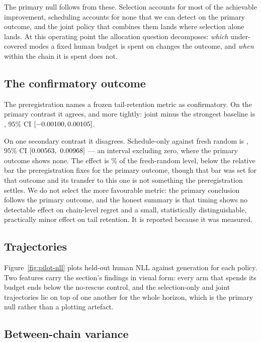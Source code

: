 The primary null follows from these. Selection accounts for most of the achievable
improvement, scheduling accounts for none that we can detect on the primary outcome, and
the joint policy that combines them lands where selection alone lands. At this operating
point the allocation question decomposes: \emph{which} under-covered modes a fixed human
budget is spent on changes the outcome, and \emph{when} within the chain it is spent does
not.

\subsection{The confirmatory outcome}

The preregistration names a frozen tail-retention metric as confirmatory. On the primary
contrast it agrees, and more tightly: joint minus the strongest baseline is
\PilotTailPrimaryMean{}, $95\%$ CI $[-0.00100, 0.00105]$.

On one secondary contrast it disagrees. Schedule-only against fresh random is
\PilotTailSchedRandMean{}, $95\%$ CI $[\PilotTailSchedRandLow,\allowbreak\ \PilotTailSchedRandHigh]$
--- an interval excluding zero, where the primary outcome shows none. The effect is
\PilotTailSchedRandPct\% of the fresh-random level, below the relative bar the
preregistration fixes for the primary outcome, though that bar was set for that outcome and
its transfer to this one is not something the preregistration settles. We do not select the
more favourable metric: the primary conclusion follows the primary outcome, and the honest
summary is that timing shows no detectable effect on chain-level regret and a small,
statistically distinguishable, practically minor effect on tail retention. It is reported
because it was measured.

\subsection{Trajectories}

Figure~\ref{fig:pilot-nll} plots held-out human NLL against generation for each policy.
Two features carry the section's findings in visual form: every arm that spends its budget
ends below the no-rescue control, and the selection-only and joint trajectories lie on top
of one another for the whole horizon, which is the primary null rather than a plotting
artefact.

\subsection{Between-chain variance}

